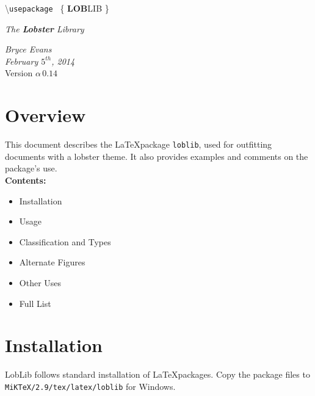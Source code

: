 \documentclass[11pt]{article}
\begin{document}
\vspace*{-3cm}
\hspace*{-0.5cm}

\vspace*{-2cm}

\Large \hspace{5em} {\color{darkgrey}\textbackslash \texttt{usepackage
}}
\Huge \{ \textbf{LOB}LIB \}

		\begin{center}
\hspace{7em} \huge \textit{{\color{crimson} The \textbf{Lobster} Library}}
\end{center}


\normalsize


\textit{Bryce Evans} \\
\textit{February $5^{th}$, 2014}\\
Version $\alpha\, 0.14$ \\

\section*{Overview}

This document describes the \LaTeX package \texttt{loblib}, used for outfitting documents with a lobster theme. It also provides examples and comments on the package's use. \\


\textbf{Contents:}
\begin{itemize} \itemsep-0em
\item Installation
\item Usage
\item Classification and Types
\item Alternate Figures
\item Other Uses
\item Full List
\end{itemize}

\vspace*{-3.5cm}
\hspace*{7.5cm}
 \hfill
\vspace*{-1.5cm}

\section*{Installation}
LobLib follows standard installation of \LaTeX packages.
Copy the package files to\\ \texttt{MiKTeX/2.9/tex/latex/loblib} for Windows.\\
\end{document}
